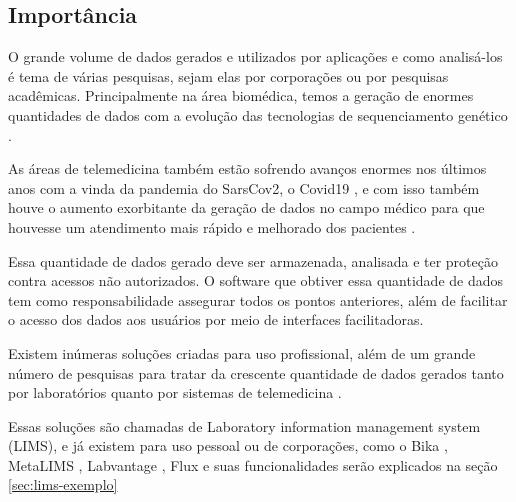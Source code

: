 \subsection{Importância}


O grande volume de dados gerados e utilizados por aplicações e como analisá-los é tema de várias pesquisas, sejam elas por corporações ou por pesquisas acadêmicas. Principalmente na área biomédica, temos a geração de enormes quantidades de dados com a evolução das tecnologias de sequenciamento genético \cite{luoJ2016}.

As áreas de telemedicina também estão sofrendo avanços enormes nos últimos anos com a vinda da pandemia do SarsCov2, o Covid19 \cite{bakhtiar2020, kronenfeld2021, Gates2020}, e com isso também houve o aumento exorbitante da geração de dados no campo médico para que houvesse um atendimento mais rápido e melhorado dos pacientes \cite{abd2018design, Coakley2015}.

Essa quantidade de dados gerado deve ser armazenada, analisada e ter proteção contra acessos não autorizados. O software que obtiver essa quantidade de dados tem como responsabilidade assegurar todos os pontos anteriores, além de facilitar o acesso dos dados aos usuários por meio de interfaces facilitadoras.

Existem inúmeras soluções criadas para uso profissional, além de um grande número de pesquisas para tratar da crescente quantidade de dados gerados tanto por laboratórios quanto por sistemas de telemedicina \cite{Mangrulkar2022}.

Essas soluções são chamadas de Laboratory information management system (LIMS), e já existem para uso pessoal ou de corporações, como o Bika \cite{Goodblatt2006}, MetaLIMS \cite{Heinle2017}, Labvantage \cite{Smallmon2017}, Flux \cite{Melo2010} e suas funcionalidades serão explicados na seção \ref{sec:lims-exemplo}


